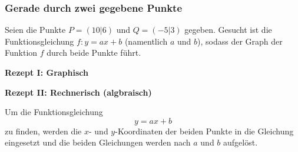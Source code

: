 
\subsubsection{Gerade durch zwei gegebene Punkte}

Seien die Punkte $P=(10|6)$ und $Q=(-5|3)$ gegeben.
Gesucht ist die Funktionsgleichung $f: y=ax+b$ (namentlich $a$ und $b$), sodass
der Graph der Funktion $f$ durch beide Punkte führt.


\textbf{Rezept I: Graphisch}\\

\vspace{1mm}

\newpage

\textbf{Rezept II: Rechnerisch (algbraisch)}\\

\vspace{1mm}

\begin{rezept}{}{}
Um die Funktionsgleichung $$y=ax+b$$ zu finden,
  werden die $x$- und $y$-Koordinaten der beiden Punkte in die Gleichung eingesetzt und die beiden Gleichungen werden nach $a$ und $b$ aufgelöst. 
\end{rezept}

